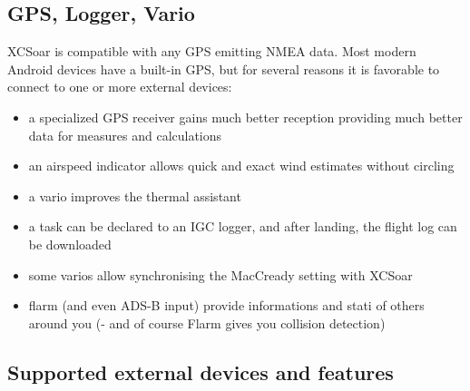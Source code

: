 \subsection*{GPS, Logger, Vario}

XCSoar is compatible with any GPS emitting NMEA data.  Most modern
Android devices have a built-in GPS, but for several reasons it is favorable to
connect to one or more external devices:

\begin{itemize}
\item a specialized GPS receiver gains much better reception providing much 
better data for measures and calculations
\item an airspeed indicator allows quick and exact wind estimates
  without circling
\item a vario improves the thermal assistant
\item a task can be declared to an IGC logger, and after landing, the
  flight log can be downloaded
\item some varios allow synchronising the MacCready setting with
  XCSoar
\item flarm (and even ADS-B input) provide informations and stati of others 
around you (- and of course Flarm gives you collision detection)
\end{itemize}

\subsection*{Supported external devices and features}
\label{sec:supported-varios}

\newcommand{\y}[0]{{ $\surd$ }}
\noindent{}

